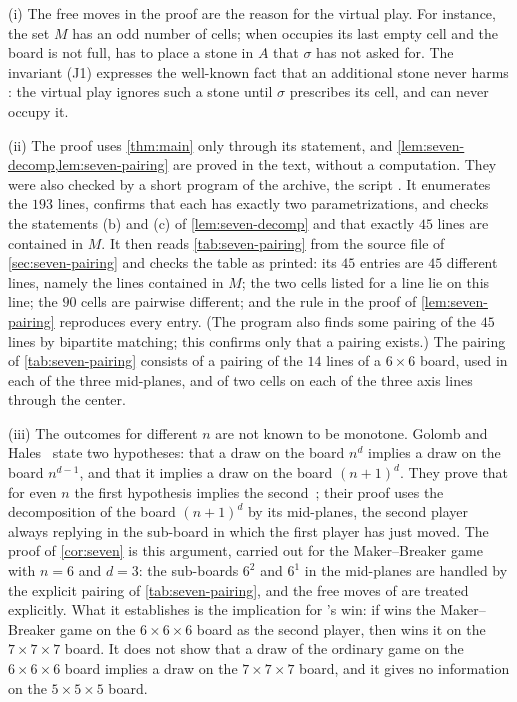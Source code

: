 \begin{remark}\label{rem:seven}
(i) The free moves in the proof are the reason for the virtual play. For instance, the set $M$ has an
odd number of cells; when \Maker{} occupies its last empty cell and the board is not full, \Breaker{}
has to place a stone in $A$ that $\sigma$ has not asked for. The invariant (J1) expresses the well-known fact that an additional stone never
harms \Breaker: the virtual play ignores such a stone until $\sigma$ prescribes its cell, and \Maker{}
can never occupy it.

(ii) The proof uses \cref{thm:main} only through its statement, and \cref{lem:seven-decomp,lem:seven-pairing}
are proved in the text, without a computation. They were also checked by a short program of the archive, the script
\mbox{}. It enumerates the $193$ lines, confirms that each
has exactly two parametrizations, and checks the statements (b) and (c) of \cref{lem:seven-decomp} and that
exactly $45$ lines are contained in $M$. It then reads \cref{tab:seven-pairing} from the source file of
\cref{sec:seven-pairing} and checks the table as printed: its $45$ entries are $45$ different lines, namely
the lines contained in $M$; the two cells listed for a line lie on this line; the $90$ cells are pairwise
different; and the rule in the proof of \cref{lem:seven-pairing} reproduces every entry. (The program also
finds some pairing of the $45$ lines by bipartite matching; this confirms only that a pairing exists.) The
pairing of \cref{tab:seven-pairing} consists of a pairing of the $14$ lines of a $6\times6$ board, used in
each of the three mid-planes, and of two cells on each of the three axis lines through the center.

(iii) The outcomes for different $n$ are not known to be monotone. Golomb and
Hales~\cite[Section~8]{GolombHales2002} state two hypotheses: that a draw on the board $n^d$ implies a draw
on the board $n^{d-1}$, and that it implies a draw on the board $(n+1)^d$. They prove that for even $n$ the
first hypothesis implies the second~\cite[Theorem~3]{GolombHales2002}; their proof uses the decomposition of
the board $(n+1)^d$ by its mid-planes, the second player always replying in the sub-board in which the
first player has just moved. The proof of \cref{cor:seven} is this argument, carried out for the
Maker--Breaker game with $n=6$ and $d=3$: the sub-boards $6^2$ and $6^1$ in the mid-planes are handled by the
explicit pairing of \cref{tab:seven-pairing}, and the free moves of \Breaker{} are treated explicitly. What
it establishes is the implication for \Breaker's win: if \Breaker{} wins the Maker--Breaker game on the
$6\times6\times6$ board as the second player, then \Breaker{} wins it on the $7\times7\times7$ board. It does
not show that a draw of the ordinary game on the $6\times6\times6$ board implies a draw on the
$7\times7\times7$ board, and it gives no information on the $5\times5\times5$ board.
\end{remark}

